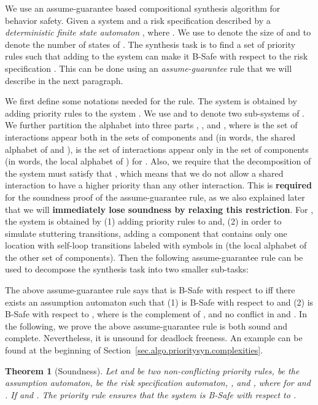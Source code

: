 \documentclass[10pt, a4paper, onecolumn, conference, compsocconf]{IEEEtran}
\newtheorem{theo}{Theorem}
\begin{document}
We use an assume-guarantee based compositional synthesis algorithm for behavior safety. Given a system  and a risk specification described by a \textit{deterministic finite state automaton} , where . We use  to denote the size of  and  to denote the number of states of .
The synthesis task is to find a set of priority rules  such that adding  to the system  can make it B-Safe with respect to the risk specification . This can be done using an \emph{assume-guarantee} rule that we will describe in the next paragraph.

We first define some notations needed for the rule. The system  is obtained by adding priority rules  to the system .
We use  and  to denote two sub-systems of . We further partition the alphabet  into three parts , , and , where  is the set of interactions appear both in the sets of components  and  (in words, the shared alphabet of  and ),  is the set of interactions appear only in the set of components  (in words, the local alphabet of ) for . Also, we require that the decomposition of the system must satisfy that , which means that we do not allow a shared interaction to have a higher priority than any other interaction.
This is \textbf{required} for the soundness proof of the assume-guarantee rule, as we also explained later
that we will \textbf{immediately lose soundness by relaxing this restriction}.
For , the system  is obtained by (1) adding priority rules  to  and, (2) in order to simulate stuttering transitions, adding a component  that contains only one location with self-loop transitions labeled with symbols in  (the local alphabet of the other set of components).
Then the following assume-guarantee rule can be used to decompose the synthesis task into two smaller sub-tasks:



The above assume-guarantee rule says that  is B-Safe with respect to  iff there exists an assumption automaton  such that (1)  is B-Safe with respect to  and (2)  is B-Safe with respect to , where  is the complement of ,  and no conflict in  and . In the following, we prove the above assume-guarantee rule is both sound and complete. Nevertheless, it is unsound for deadlock freeness. An example can be found at the beginning of Section~\ref{sec.algo.prioritysyn.complexities}.

\begin{theo}[Soundness]\label{the:ag-sound}
Let  and  be two non-conflicting priority rules,  be the assumption automaton,  be the risk specification automaton, , and , where  for  and . If  and . The priority rule  ensures that the system  is B-Safe with respect to .
\end{theo}
\end{document}
